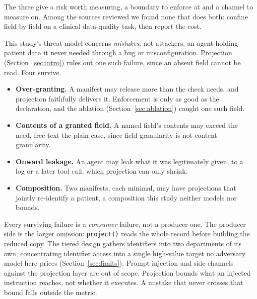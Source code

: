 The three give a risk worth measuring, a boundary to enforce at and a channel to measure on. Among
the sources reviewed we found none that does both: confine field by field on a clinical
data-quality task, then report the cost.

This study's threat model concerns \emph{mistakes}, not attackers: an agent holding patient data it
never needed through a bug or misconfiguration. Projection (Section~\ref{sec:intro}) rules out one
such failure, since an absent field cannot be read. Four survive.

\begin{itemize}[leftmargin=1.4em, itemsep=0.15em]
  \item \textbf{Over-granting.} A manifest may release more than the check needs, and projection
        faithfully delivers it. Enforcement is only as good as the declaration, and the ablation
        (Section~\ref{sec:ablation}) caught one such field.
  \item \textbf{Contents of a granted field.} A named field's contents may exceed the need, free text
        the plain case, since field granularity is not content granularity.
  \item \textbf{Onward leakage.} An agent may leak what it was legitimately given, to a log or a
        later tool call, which projection can only shrink.
  \item \textbf{Composition.} Two manifests, each minimal, may have projections that jointly
        re-identify a patient, a composition this study neither models nor bounds.
\end{itemize}

Every surviving failure is a \emph{consumer} failure, not a producer one. The producer side is the
larger omission: \texttt{project()} reads the whole record before building the reduced copy. The
tiered design gathers identifiers into two departments of its own, concentrating identifier access
into a single high-value target no adversary model here prices (Section~\ref{sec:limits}). Prompt
injection and side channels against the projection layer are out of scope. Projection bounds what an
injected instruction reaches, not whether it executes. A mistake that never crosses that bound falls
outside the metric.
